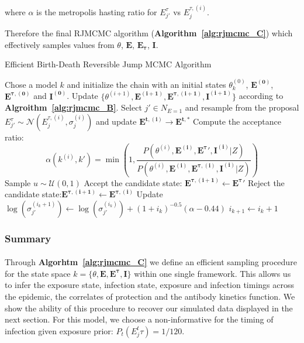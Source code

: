 where $\alpha$ is the metropolis hasting ratio for $E_{j'}^{\tau}$ vs $E_j^{\tau, (i)}$.

Therefore the final RJMCMC algorithm (\textbf{Algorithm~\ref{alg:rjmcmc_C}}) which effectively samples values from $\theta$, $\mathbf{E}$, $\mathbf{E_\tau}$, $\mathbf{I}$. 

\begin{algorithm}[H]
\caption{Efficient Birth-Death Reversible Jump MCMC Algorithm}
\label{alg:rjmcmc_C}
\begin{algorithmic}[1]
 \State Chose a model $k$ and initialize the chain with an initial states $\theta^{(0)}_{k}$, $\mathbf{E^{(0)}}$, $\mathbf{E^{\tau, (0)}}$ and $\mathbf{I^{(0)}}$.
    	\State Update $\{\theta^{(i + 1)}, \mathbf{E^{(i + 1)}}, \mathbf{E^{\tau, (i + 1)}}, \mathbf{I^{(i + 1)}}\}$ according to \textbf{Algroithm~\ref{alg:rjmcmc_B}}.
        \State Select $j' \in N_{E = 1}$ and resample from the proposal $E_{j'}^{\tau} \sim \mathcal{N}\left(E_{j}^{\tau, (i)}, \sigma^{(i)}_{j}\right)$ and update $\mathbf{E^{t, (i)}} \rightarrow \mathbf{E^{t, *}}$
            \State Compute the acceptance ratio:
        		\[
        		\alpha(k^{(i)}, k') = \min\left(1, \frac{P(\theta^{(i)}, \mathbf{E^{(i)}}, \mathbf{E^{\tau}'}, \mathbf{I^{(i)}}|Z)}{P(\theta^{(i)}, \mathbf{E^{(i)}}, \mathbf{E^{\tau, (i)}}, \mathbf{I^{(i)}}|Z)} \right)
        			\]
  \State Sample $u \sim \mathcal{U}(0, 1)$
            	\State Accept the candidate state: $\mathbf{E^{\tau, (i + 1)}}  \leftarrow \mathbf{E^{\tau}'} $
        \Else
            \State Reject the candidate state:$\mathbf{E^{\tau, (i + 1)}}  \leftarrow \mathbf{E^{\tau, (i)}} $
        \EndIf 
        \State Update $\log\left(\sigma_{j'}^{(i_k + 1)}\right) \leftarrow \log\left(\sigma_{j'}^{(i_k)}\right) + (1 +  i_k)^{-0.5}(\alpha - 0.44)$
        \State $i_{k + 1} \leftarrow i_k + 1$
            \EndFor
    \EndFor
\end{algorithmic}
\end{algorithm}


\subsubsection{Summary}
\paragraph{}Through \textbf{Algorhtm~\ref{alg:rjmcmc_C}} we define an efficient sampling procedure for the state space $k = \{\theta, \mathbf{E}, \mathbf{E^\tau}, \mathbf{I}\}$ within one single framework. This allows us to infer the exposure state, infection state, exposure and infection timings across the epidemic, the correlates of protection and the antibody kinetics function. We show the ability of this procedure to recover our simulated data displayed in the next section.
 For this model, we choose a non-informative for the timing of infection given exposure prior: $P_t(E_j^t\tau) = 1 / 120$.

